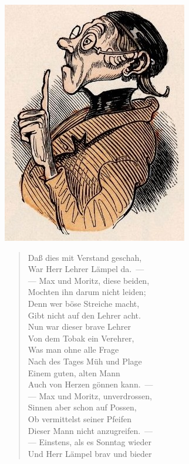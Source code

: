 \documentclass[a4paper,12pt]{article}
\begin{document}
\begin{center}\includegraphics[scale=.7, alt={Lehrer Lämpel}]{images/4-01.jpg}\end{center}



\begin{verse}
Daß dies mit Verstand geschah,\\{}
War Herr Lehrer Lämpel da.~—\\{}
— Max und Moritz, diese beiden,\\{}
Mochten ihn darum nicht leiden;\\{}
Denn wer böse Streiche macht,\\{}
Gibt nicht auf den Lehrer acht.\\{}
Nun war dieser brave Lehrer\\{}
Von dem Tobak ein Verehrer,\\{}
Was man ohne alle Frage\\{}
Nach des Tages Müh und Plage\\{}
Einem guten, alten Mann\\{}
Auch von Herzen gönnen kann.~—\\{}
— Max und Moritz, unverdrossen,\\{}
Sinnen aber schon auf Possen,\\{}
Ob vermittelst seiner Pfeifen\\{}
Dieser Mann nicht anzugreifen.~—\\{}
— Einstens, als es Sonntag wieder\\{}
Und Herr Lämpel brav und bieder
\end{verse}
\end{document}

